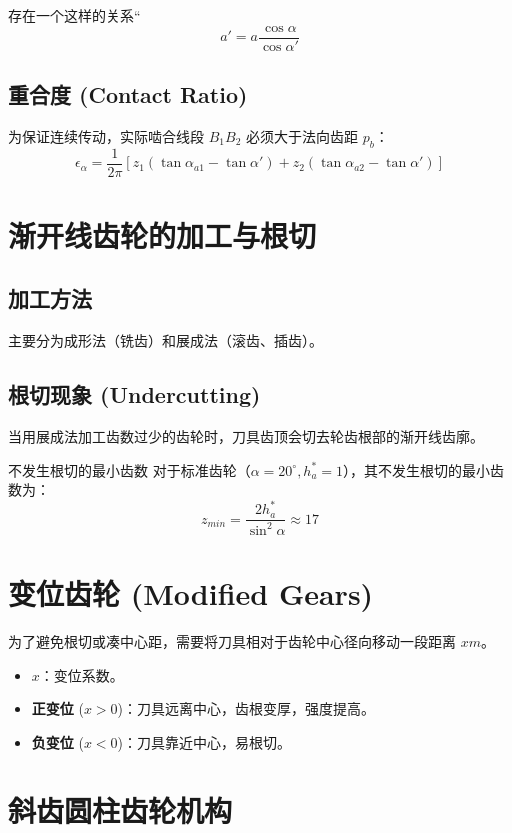 存在一个这样的关系“
\begin{equation}
	a'=a\frac{\cos \alpha}{\cos \alpha'}
\end{equation}
\subsection{重合度 (Contact Ratio)}
为保证连续传动，实际啮合线段 $B_1B_2$ 必须大于法向齿距 $p_b$：
\begin{equation}
	\epsilon_\alpha = \frac{1}{2\pi}[z_1(\tan \alpha_{a1}-\tan \alpha')+z_2(\tan \alpha_{a2}-\tan \alpha')]
\end{equation}

\section{渐开线齿轮的加工与根切}

\subsection{加工方法}
主要分为成形法（铣齿）和展成法（滚齿、插齿）。

\subsection{根切现象 (Undercutting)}
当用展成法加工齿数过少的齿轮时，刀具齿顶会切去轮齿根部的渐开线齿廓。
\begin{theorem}{不发生根切的最小齿数}
	对于标准齿轮（$\alpha = 20^\circ, h_a^* = 1$），其不发生根切的最小齿数为：
	\begin{equation}
		z_{min} = \frac{2h_a^*}{\sin^2 \alpha} \approx 17
	\end{equation}
\end{theorem}

\section{变位齿轮 (Modified Gears)}

为了避免根切或凑中心距，需要将刀具相对于齿轮中心径向移动一段距离 $xm$。
\begin{itemize}
	\item $x$：变位系数。
	\item \textbf{正变位} ($x>0$)：刀具远离中心，齿根变厚，强度提高。
	\item \textbf{负变位} ($x<0$)：刀具靠近中心，易根切。
\end{itemize}

\section{斜齿圆柱齿轮机构}

